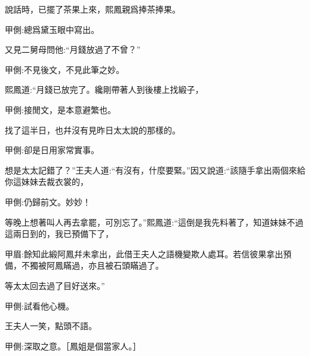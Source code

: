 \begin{parag}
    說話時，已擺了茶果上來，熙鳳親爲捧茶捧果。\begin{note}甲側:總爲黛玉眼中寫出。\end{note}又見二舅母問他:“月錢放過了不曾？”\begin{note}甲側:不見後文，不見此筆之妙。\end{note}熙鳳道:“月錢已放完了。纔剛帶著人到後樓上找緞子，\begin{note}甲側:接閒文，是本意避繁也。\end{note}找了這半日，也幷沒有見昨日太太說的那樣的。\begin{note}甲側:卻是日用家常實事。\end{note}想是太太記錯了？”王夫人道:“有沒有，什麼要緊。”因又說道:“該隨手拿出兩個來給你這妹妹去裁衣裳的，\begin{note}甲側:仍歸前文。妙妙！\end{note}等晚上想著叫人再去拿罷，可別忘了。”熙鳳道:“這倒是我先料著了，知道妹妹不過這兩日到的，我已預備下了，\begin{note}甲眉:餘知此緞阿鳳幷未拿出，此借王夫人之語機變欺人處耳。若信彼果拿出預備，不獨被阿鳳瞞過，亦且被石頭瞞過了。\end{note}等太太回去過了目好送來。”\begin{note}甲側:試看他心機。\end{note}王夫人一笑，點頭不語。\begin{note}甲側:深取之意。［鳳姐是個當家人。］\end{note}
\end{parag}


